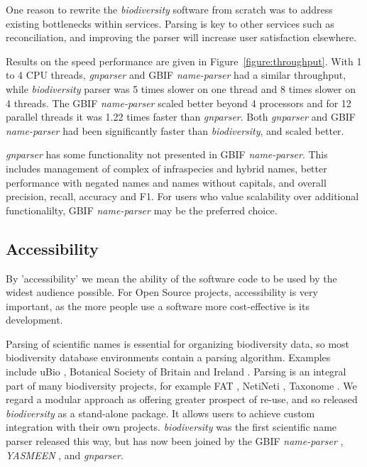 \documentclass{bmcart}
\begin{document}
One reason to rewrite the \textit{biodiversity} software from scratch was to
address existing bottlenecks within services. Parsing is key to other services
such as reconciliation, and improving the parser will increase user
satisfaction elsewhere.

Results on the speed performance are given in Figure~\ref{figure:throughput}.
With 1 to 4 CPU threads, \textit{gnparser} and GBIF \textit{name-parser} had a
similar throughput, while \textit{biodiversity} parser was 5 times slower on
one thread and  8 times slower on 4 threads. The GBIF \textit{name-parser}
scaled better beyond 4 processors and for 12 parallel threads it was 1.22 times
faster than \textit{gnparser}.  Both \textit{gnparser} and GBIF
\textit{name-parser} had been significantly faster than \textit{biodiversity},
and scaled better.

 \textit{gnparser} has some functionality not presented in
GBIF \textit{name-parser}. This includes management of complex of infraspecies and hybrid names, better performance with negated names and names without capitals, and overall precision, recall, accuracy and F1.  For users who value scalability over
additional functionalilty, GBIF \textit{name-parser} may be the preferred choice.

\subsection*{Accessibility}

By 'accessibility' we mean the ability of the software code to be used by the widest
audience possible. For Open Source projects, accessibility is very important,
as the more people use a software more cost-effective is its development.

Parsing of scientific names is essential for organizing biodiversity data, so most biodiversity database environments
contain a parsing algorithm.  Examples include  uBio
\cite{ubio:parser}, Botanical Society of Britain and Ireland
\cite{botsociety:parser}.  Parsing is an integral part of many biodiversity
projects, for example FAT \cite{Sautter2006}, NetiNeti \cite{Akella2012},
Taxonome \cite{Kluyver2013}. We regard a modular approach as offering greater prospect of re-use, and so  released
\textit{biodiversity} \cite{Boyle2013} as a stand-alone package.  It allows
 users to achieve custom integration  with their own projects.
\textit{biodiversity} was the first scientific name parser released this way, but has now been joined by the GBIF \textit{name-parser} \cite{gbifNameParser}, \textit{YASMEEN}
\cite{VandenBerghe2015}, and \textit{gnparser}.
\end{document}
